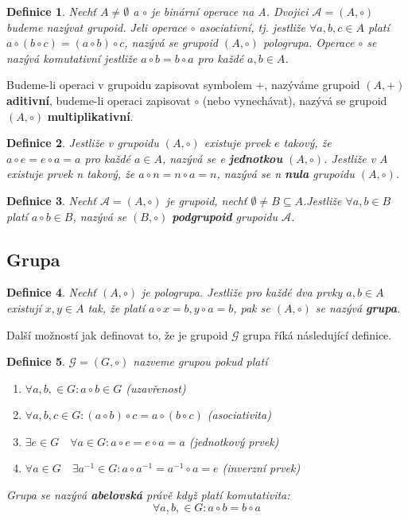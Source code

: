 \documentclass[12pt,a4paper]{article}
\newtheorem{definition}{Definice}
\begin{document}
\begin{definition}
	Nechť $A \not= \emptyset$ a $\circ$ je binární operace na A. Dvojici $\mathscr{A} = (A, \circ)$ budeme nazývat grupoid. Jeli operace $\circ$ asociativní, tj. jestliže $\forall a,b,c \in A$ platí $a \circ (b \circ c) = (a \circ b) \circ c$, nazývá se grupoid $(A, \circ)$ pologrupa. Operace $\circ$ se nazývá komutativní jestliže $a \circ b = b \circ a$ pro každé $a,b \in A$.
\end{definition}

Budeme-li operaci v grupoidu zapisovat symbolem +, nazýváme grupoid $(A, +)$ \textbf{aditivní}, budeme-li operaci zapisovat $\circ$ (nebo vynechávat), nazývá se grupoid $(A, \circ)$ \textbf{multiplikativní}.

\begin{definition}
	Jestliže v grupoidu $(A, \circ)$ existuje prvek $e$ takový, že $a \circ e = e \circ a = a$ pro každé $a \in A$, nazývá se e \textbf{jednotkou} $(A, \circ)$. Jestliže v A existuje prvek n takový, že $a \circ n = n \circ a = n$, nazývá se n \textbf{nula} grupoidu $(A, \circ)$.
\end{definition}

\begin{definition}
	Nechť $\mathscr{A} = (A, \circ)$ je grupoid, nechť $\emptyset \not= B \subseteq A$.Jestliže $\forall a,b \in B$ platí $a \circ b \in B$, nazývá se $(B, \circ)$ \textbf{podgrupoid} grupoidu $\mathscr{A}$.
\end{definition}

\subsection{Grupa}
\begin{definition}
	Nechť $(A, \circ)$ je pologrupa. Jestliže pro každé dva prvky $a,b \in A$ existují $x,y \in A$ tak, že platí  $a \circ x = b, y \circ a = b$, pak se $(A, \circ)$ se nazývá \textbf{grupa}.
\end{definition}

Další možností jak definovat to, že je grupoid $\mathscr{G}$ grupa říká následující definice.
\begin{definition}
	 $\mathscr{G} = (G, \circ)$  nazveme grupou pokud platí
	\begin{enumerate}
		\item $\forall a,b, \in G : a \circ b \in G$ (uzavřenost)
		\item $\forall a,b,c \in G : (a \circ b) \circ c = a \circ (b \circ c)$ (asociativita)
		\item $\exists e \in G \quad \forall a \in G : a \circ e = e \circ a = a$ (jednotkový prvek)
		\item $\forall a \in G \quad \exists a^{-1} \in G : a \circ a^{-1} = a^{-1} \circ a = e$ (inverzní prvek)
	\end{enumerate}
	Grupa se nazývá \textbf{abelovská} právě když platí komutativita: $$\forall a,b, \in G : a \circ b = b \circ a$$
\end{definition}
\end{document}
